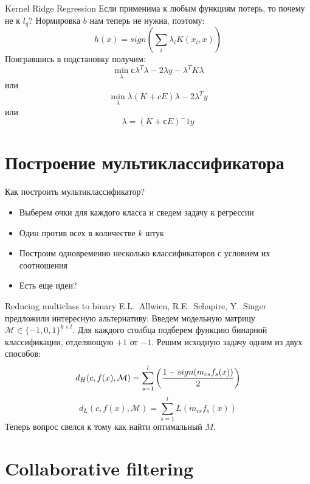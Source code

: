 \documentclass[14pt, fleqn, xcolor={dvipsnames, table}]{beamer}
\begin{document}
\begin{frame}{Kernel Ridge Regression}
\small
Если применима к любым функциям потерь, то почему не к $l_q$? Нормировка $b$ нам теперь не нужна, поэтому:
$$
h(x) = sign \left(\sum_i \lambda_i K(x_i, x)\right)
$$
Поигравшись в подстановку получим:
$$
\min_\lambda с \lambda^T\lambda - 2 \lambda y - \lambda^T K \lambda
$$
или
$$
\min_\lambda \lambda (K + cE) \lambda - 2\lambda^T y
$$
или
$$
\lambda = \left(K + с E\right)^-1y
$$
\end{frame}

\section{Построение мультиклассификатора} %
\begin{frame}{Как построить мультиклассификатор?}
\begin{itemize}
  \item Выберем очки для каждого класса и сведем задачу к регрессии
  \item Один против всех в количестве $k$ штук
  \item Построим одновременно несколько классификаторов с условием их соотношения
  \item Есть еще идеи?
\end{itemize}
\end{frame}

\begin{frame}{Reducing multiclass to binary}
E.L.~Allwien, R.E.~Schapire, Y.~Singer предложили интересную альтернативу:
Введем модельную матрицу $\mathcal{M} \in \{-1,0,1\}^{k\times l}$. Для каждого столбца подберем функцию бинарной классификации, отделяющую $+1$ от $-1$.
Решим исходную задачу одним из двух способов:
$$
d_H(c, f(x), \mathcal{M}) = \sum_{s = 1}^l\left({1 - sign(m_{cs} f_s(x)) \over 2}\right)
$$
$$
d_L(c, f(x), \mathcal{M}) = \sum_{s = 1}^l L(m_{cs} f_s(x))
$$
Теперь вопрос свелся к тому как найти оптимальный $M$.
\end{frame}

\section{Collaborative filtering}
\end{document}
